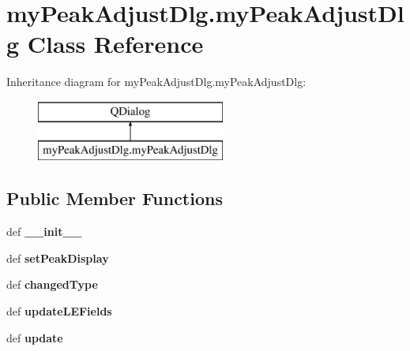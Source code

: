 \hypertarget{classmyPeakAdjustDlg_1_1myPeakAdjustDlg}{\section{my\-Peak\-Adjust\-Dlg.\-my\-Peak\-Adjust\-Dlg Class Reference}
\label{classmyPeakAdjustDlg_1_1myPeakAdjustDlg}
}
Inheritance diagram for my\-Peak\-Adjust\-Dlg.\-my\-Peak\-Adjust\-Dlg\-:\begin{figure}[H]
\begin{center}
\leavevmode
\includegraphics[height=2.000000cm]{classmyPeakAdjustDlg_1_1myPeakAdjustDlg}
\end{center}
\end{figure}
\subsection*{Public Member Functions}
\begin{DoxyCompactItemize}
\item 
\hypertarget{classmyPeakAdjustDlg_1_1myPeakAdjustDlg_abaacb5b4b52585a3c95c3709c7ddc87a}{def {\bfseries \-\_\-\-\_\-init\-\_\-\-\_\-}}\label{classmyPeakAdjustDlg_1_1myPeakAdjustDlg_abaacb5b4b52585a3c95c3709c7ddc87a}

\item 
\hypertarget{classmyPeakAdjustDlg_1_1myPeakAdjustDlg_a8a3b1f75dfe5592add8cf68686659a41}{def {\bfseries set\-Peak\-Display}}\label{classmyPeakAdjustDlg_1_1myPeakAdjustDlg_a8a3b1f75dfe5592add8cf68686659a41}

\item 
\hypertarget{classmyPeakAdjustDlg_1_1myPeakAdjustDlg_a5ff4c61e897515906ea1cf647a8ebb4e}{def {\bfseries changed\-Type}}\label{classmyPeakAdjustDlg_1_1myPeakAdjustDlg_a5ff4c61e897515906ea1cf647a8ebb4e}

\item 
\hypertarget{classmyPeakAdjustDlg_1_1myPeakAdjustDlg_ad3012bad6f6dbe3c06af6758dab86acb}{def {\bfseries update\-L\-E\-Fields}}\label{classmyPeakAdjustDlg_1_1myPeakAdjustDlg_ad3012bad6f6dbe3c06af6758dab86acb}

\item 
\hypertarget{classmyPeakAdjustDlg_1_1myPeakAdjustDlg_afde46489a42cbb16452829ef81097005}{def {\bfseries update}}\label{classmyPeakAdjustDlg_1_1myPeakAdjustDlg_afde46489a42cbb16452829ef81097005}

\end{DoxyCompactItemize}
